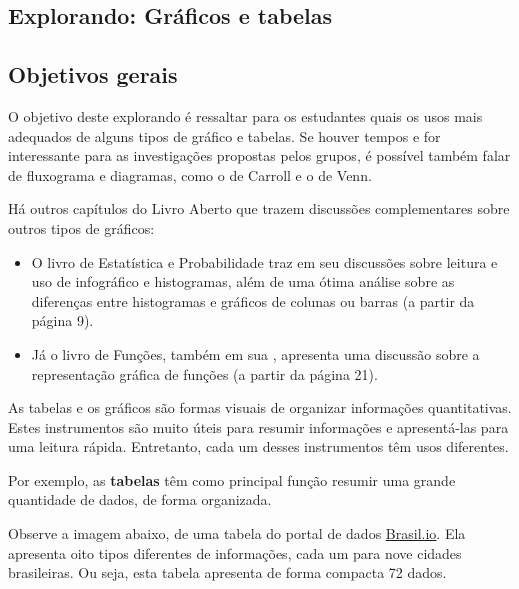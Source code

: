 \clearpage

\def\currentcolor{session1}
\begin{texto}
{
  \section{Explorando: Gráficos e tabelas}
  \subsection{Objetivos gerais}

  O objetivo deste explorando é ressaltar para os estudantes quais os usos mais adequados de alguns tipos de gráfico e tabelas. Se houver tempos e for interessante para as investigações propostas pelos grupos, é possível também falar de fluxograma e diagramas, como o de Carroll e o de Venn.

  Há outros capítulos do Livro Aberto que trazem discussões complementares sobre outros tipos de gráficos:

  \begin{itemize}
  \item O livro de Estatística e Probabilidade traz em seu  discussões sobre leitura e uso de infográfico e histogramas, além de uma ótima análise sobre as diferenças entre histogramas e gráficos de colunas ou barras (a partir da página 9).
    
  \item Já o livro de Funções, também em sua , apresenta uma discussão sobre a representação gráfica de funções (a partir da página 21).
  \end{itemize}

}
\end{texto}

As tabelas e os gráficos são formas visuais de organizar informações quantitativas. Estes instrumentos são muito úteis para resumir informações e apresentá-las para uma leitura rápida. Entretanto, cada um desses instrumentos têm usos diferentes.

Por exemplo, as \textbf{tabelas} têm como principal função resumir uma grande quantidade de dados, de forma organizada.

Observe a imagem abaixo, de uma tabela do portal de dados \url{Brasil.io}. Ela apresenta oito tipos diferentes de informações, cada um para nove cidades brasileiras. Ou seja, esta tabela apresenta de forma compacta 72 dados.

